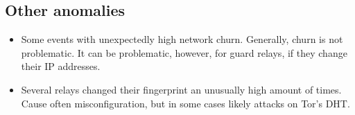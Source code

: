 \subsection{Other anomalies}
\begin{itemize}
	\item Some events with unexpectedly high network churn.  Generally, churn
		is not problematic.  It can be problematic, however, for guard relays,
		if they change their IP addresses.

	\item Several relays changed their fingerprint an unusually high amount of
		times.  Cause often misconfiguration, but in some cases likely attacks
		on Tor's DHT.
\end{itemize}

